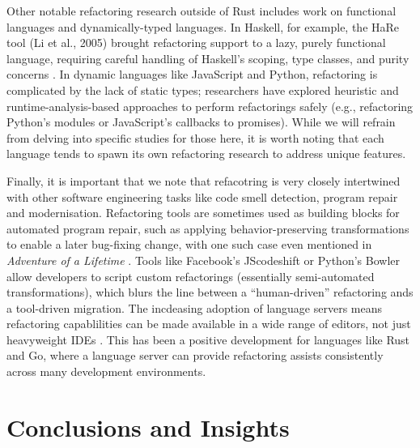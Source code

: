 Other notable refactoring research outside of Rust includes work on functional
languages and dynamically-typed languages. In Haskell, for example, the HaRe
tool (Li et al., 2005) brought refactoring support to a lazy, purely functional
language, requiring careful handling of Haskell's scoping, type classes, and
purity concerns \cite{HaRe}. In dynamic languages like JavaScript and Python, refactoring is
complicated by the lack of static types; researchers have explored heuristic and
runtime-analysis-based approaches to perform refactorings safely (e.g.,
refactoring Python's modules or JavaScript's callbacks to promises). While we
will refrain from delving into specific studies for those here, it is worth noting that each
language tends to spawn its own refactoring research to address unique features.

Finally, it is important that we note that refacotring is very closely
intertwined with other software engineering tasks like code smell detection,
program repair and modernisation. Refactoring tools are sometimes used as
building blocks for automated program repair, such as applying
behavior-preserving transformations to enable a later bug-fixing change, with
one such case even mentioned in
\textit{Adventure of a Lifetime} \cite{AdventureOfALifetime}. Tools like
Facebook's JScodeshift or Python's Bowler allow developers to script custom
refactorings (essentially semi-automated transformations), which blurs the line
between a ``human-driven'' refactoring ands a tool-driven migration. The
incdeasing adoption of language servers means refactoring capablilities can be
made available in a wide range of editors, not just heavyweight IDEs
\cite{AdventureOfALifetime}. This has been a positive development for languages
like Rust and Go, where a language server can provide refactoring assists
consistently across many development environments.

\section{Conclusions and Insights}
\label{sec:lit_concusions}



\renewcommand\thefigure{\thechapter .\arabic{figure}}